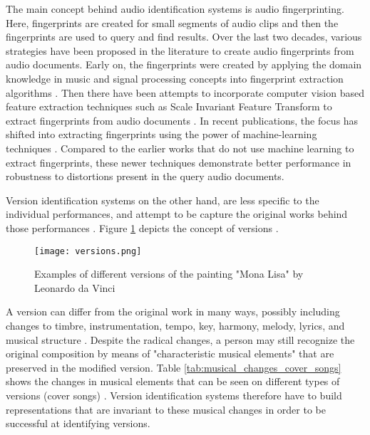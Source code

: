 \documentclass[../main.tex]{subfiles}
\begin{document}
\par
The main concept behind audio identification systems is audio fingerprinting. Here, fingerprints are created for small segments of audio clips and then the fingerprints are  used to query and find results. Over the last two decades, various strategies have been proposed in the literature to create audio fingerprints from audio documents. Early on, the fingerprints were created by applying the domain knowledge in music and signal processing concepts into fingerprint extraction algorithms  \cite{haitsmaHighlyRobustAudio}\cite{wangIndustrialStrengthAudio2003}\cite{ellisEchoPrintOpenSource2011}\cite{miroMASKRobustLocal2012}\cite{sixPanakoScalableAcoustic2014}. Then there have been attempts to incorporate computer vision based feature extraction techniques such as Scale Invariant Feature Transform to extract fingerprints from audio documents \cite{computer_vision_for_music_identification}\cite{sift}. In recent publications, the focus has shifted into extracting fingerprints using the power of machine-learning techniques \cite{arcas_now_2017}\cite{baez_suarez_unsupervised_2020}\cite{yu_contrastive_2020}. Compared to the earlier works that do not use machine learning to extract fingerprints, these newer techniques demonstrate better performance in robustness to distortions present in the query audio documents. 
\\
\par
Version identification systems on the other hand, are less specific to the individual performances, and attempt to be capture the original works behind those performances \cite{serraAudioCoverSong2010}. Figure \ref{fig:versions} depicts the concept of versions \cite{book}.
\begin{figure}[h]
    \centering
    \texttt{[image: versions.png]}
    \caption{Examples of different versions of the painting "Mona Lisa" by Leonardo da Vinci}
    \label{fig:versions}
\end{figure}

\par
A version can differ from the original work in many ways, possibly including changes to timbre, instrumentation, tempo, key, harmony, melody, lyrics, and musical structure \cite{book}. Despite the radical changes, a person may still recognize the original composition by means of "characteristic musical elements" that are preserved in the modified version. Table \ref{tab:musical_changes_cover_songs} shows the changes in musical elements that can be seen on different types of versions (cover songs) \cite{serraAudioCoverSong2010}. Version identification systems therefore have to build representations that are invariant to these musical changes in order to be successful at identifying versions.
\end{document}
